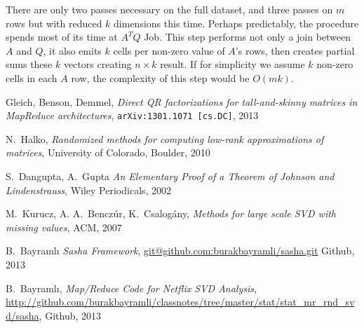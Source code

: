 \documentclass[11pt]{article}
\begin{document}
There are only two passes necessary on the full dataset, and three passes
on $m$ rows but with reduced $k$ dimensions this time.  Perhaps
predictably, the procedure spends most of its time at $A^TQ$ Job. This step
performs not only a join between $A$ and $Q$, it also emits $k$ cells per
non-zero value of $A$'s rows, then creates partial sums these $k$ vectors
creating $n \times k$ result. If for simplicity we assume $k$ non-zero
cells in each $A$ row, the complexity of this step would be $O(mk)$.


\begin{thebibliography}{1}

Gleich, Benson, Demmel, \emph{Direct QR factorizations for tall-and-skinny
  matrices in MapReduce architectures}, {\tt arXiv:1301.1071 [cs.DC]}, 2013

N.~Halko, \emph{Randomized methods for computing low-rank approximations of
  matrices}, University of Colorado, Boulder, 2010

S.~Dangupta, A.~Gupta \emph{An Elementary Proof of a Theorem of Johnson and
  Lindenstrauss}, Wiley Periodicals, 2002

M.~Kurucz, A. A.~Benczúr, K.~Csalogány, \emph{Methods for large scale SVD with
missing values}, ACM, 2007

 B.~Bayramlı \emph{Sasha Framework}, 
\url{git@github.com:burakbayramli/sasha.git}
Github, 2013

 B.~Bayramlı, \emph{Map/Reduce Code for Netflix SVD Analysis},
  \url{http://github.com/burakbayramli/classnotes/tree/master/stat/stat_mr_rnd_svd/sasha},
  Github, 2013


\end{thebibliography}
\end{document}
